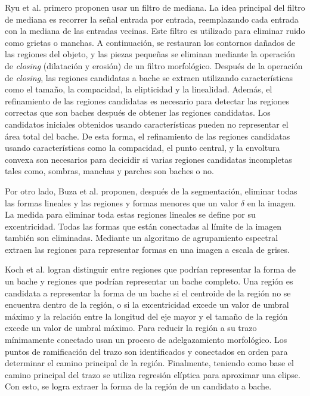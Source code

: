 		Ryu et al. primero proponen usar un filtro de mediana. La idea principal del filtro de mediana es recorrer la señal 
		entrada por entrada, reemplazando cada entrada con la mediana de las entradas vecinas. Este filtro es utilizado para eliminar ruido como grietas o manchas. 
		A continuación, se restauran los contornos dañados de las regiones del objeto, y las piezas pequeñas se eliminan mediante la operación de \emph{closing}
		(dilatación y erosión) de un filtro morfológico. Después de la operación de \emph{closing}, las regiones candidatas a bache se extraen utilizando 
		características como el tamaño, la compacidad, la elipticidad y la linealidad. Además, el refinamiento de las regiones candidatas es necesario para
		detectar las regiones correctas que son baches después de obtener las regiones candidatas. Los candidatos iniciales obtenidos usando características
		pueden no representar el área total del bache. De esta forma, el refinamiento de las regiones candidatas usando características como la compacidad,
		el punto central, y la envoltura convexa son necesarios para decicidir si varias regiones candidatas incompletas tales como, sombras, manchas y
		parches son baches o no.

		Por otro lado, Buza et al. proponen, después de la segmentación, eliminar todas las formas lineales  y las regiones y
		formas menores que un valor $\delta$ en la imagen. La medida para eliminar toda estas regiones lineales se define por su excentricidad. Todas 
		las formas que están conectadas al límite de la imagen también son eliminadas. Mediante un algoritmo de agrupamiento espectral extraen 
		las regiones para representar formas en una imagen a escala de grises. 

		Koch et al. logran distinguir entre regiones que podrían representar la forma de un bache y 
		regiones que podrían representar un bache completo. Una región es candidata a representar la forma de un bache si 
		el centroide de la región no se encuentra dentro de la región, o si la excentricidad excede un valor de umbral 
		máximo y la relación entre la longitud del eje mayor y el tamaño de la región excede un valor de umbral máximo. 
		Para reducir la región a su trazo  mínimamente conectado usan un proceso de adelgazamiento morfológico. Los puntos de 
		ramificación del trazo son identificados y conectados en orden para determinar el camino principal de la región. Finalmente, 
		teniendo como base el camino principal del trazo se utiliza regresión elíptica para aproximar una elipse. Con esto, se logra 
		extraer la forma de la región de un candidato a bache.

